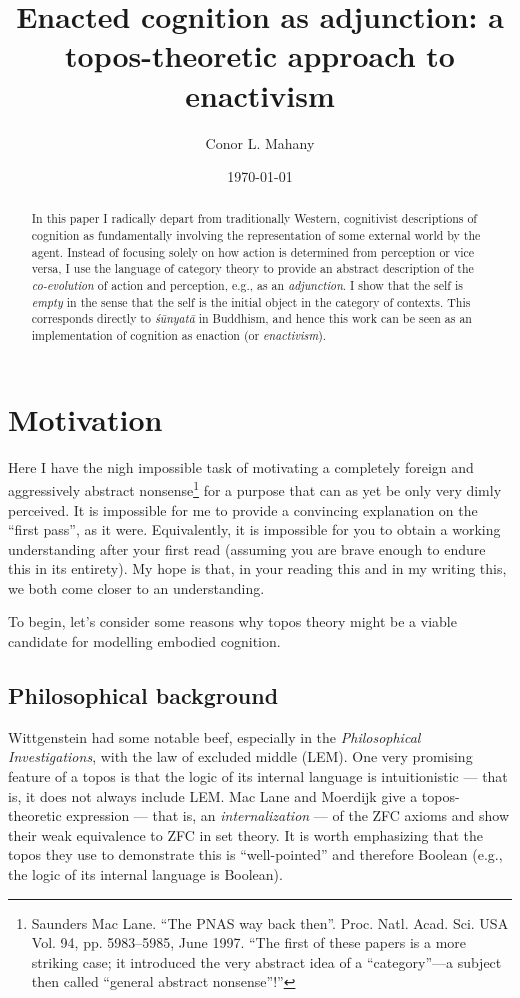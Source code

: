 \documentclass{article}
\title{Enacted cognition as adjunction: a topos-theoretic approach to enactivism}
\author{Conor L. Mahany}
\date{\today}
\begin{document}
\maketitle

\begin{abstract}
In this paper I radically depart from traditionally Western, cognitivist descriptions of cognition as fundamentally involving the representation of some external world by the agent. Instead of focusing solely on how action is determined from perception or vice versa, I use the language of category theory to provide an abstract description of the \emph{co-evolution} of action and perception, e.g., as an \emph{adjunction}. I show that the self is \emph{empty} in the sense that the self is the initial object in the category of contexts. This corresponds directly to \emph{śūnyatā} in Buddhism, and hence this work can be seen as an implementation of cognition as enaction (or \emph{enactivism}).
\end{abstract}

\tableofcontents

\section{Motivation}

Here I have the nigh impossible task of motivating a completely foreign and aggressively abstract nonsense\footnote{Saunders Mac Lane. ``The PNAS way back then''. Proc. Natl. Acad. Sci. USA Vol. 94, pp. 5983–5985, June 1997. ``The first of these papers is a more striking case; it introduced the very abstract idea of a ``category''—a subject then called ``general abstract nonsense''!''} for a purpose that can as yet be only very dimly perceived. It is impossible for me to provide a convincing explanation on the ``first pass'', as it were. Equivalently, it is impossible for you to obtain a working understanding after your first read (assuming you are brave enough to endure this in its entirety). My hope is that, in your reading this and in my writing this, we both come closer to an understanding.

To begin, let's consider some reasons why topos theory might be a viable candidate for modelling embodied cognition. 

\subsection{Philosophical background}
Wittgenstein had some notable beef, especially in the \emph{Philosophical Investigations}, with the law of excluded middle (LEM). One very promising feature of a topos is that the logic of its internal language is intuitionistic --- that is, it does not always include LEM. Mac Lane and Moerdijk give a topos-theoretic expression --- that is, an \emph{internalization} --- of the ZFC axioms and show their weak equivalence to ZFC in set theory. It is worth emphasizing that the topos they use to demonstrate this is ``well-pointed'' and therefore Boolean (e.g., the logic of its internal language is Boolean).
\end{document}
